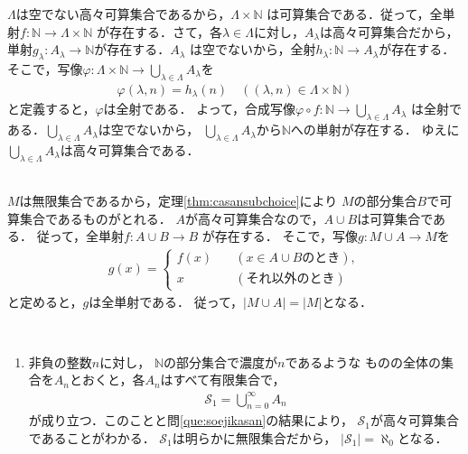 \begin{description}
  $\varLambda$は空でない高々可算集合であるから，$\varLambda \times \mathbb{N}$
  は可算集合である．従って，全単射$f: \mathbb{N} \longrightarrow \varLambda \times \mathbb{N}$
  が存在する．さて，各$\lambda \in \varLambda$に対し，$A_{\lambda}$は高々可算集合だから，
  単射$g_{\lambda} : A_{\lambda} \longrightarrow \mathbb{N}$が存在する．$A_{\lambda}$
  は空でないから，全射$h_{\lambda} : \mathbb{N} \longrightarrow A_{\lambda}$が存在する．
  そこで，写像$\varphi : \varLambda \times \mathbb{N} \longrightarrow 
  \bigcup_{\lambda \in \varLambda } A_{\lambda}$を
  \begin{align*}
    \varphi ( \lambda , n ) = h_{\lambda} (n) \quad
    ( ( \lambda , n) \in \varLambda \times \mathbb{N})
  \end{align*}
  と定義すると，$\varphi$は全射である．
  よって，合成写像$\varphi \circ f: \mathbb{N} \longrightarrow 
  \bigcup_{\lambda \in \varLambda} A_{\lambda}$
  は全射である．$\bigcup_{\lambda \in \varLambda} A_{\lambda}$は空でないから，
  $\bigcup_{\lambda \in \varLambda} A_{\lambda}$から$\mathbb{N}$への単射が存在する．
  ゆえに$\bigcup_{\lambda \in \varLambda} A_{\lambda}$は高々可算集合である．

\item[\refque{que:mugencasan}] \mbox{} \\
  $M$は無限集合であるから，定理\ref{thm:casansubchoice}により
  $M$の部分集合$B$で可算集合であるものがとれる．
  $A$が高々可算集合なので，$A \cup B$は可算集合である．
  従って，全単射$f: A \cup B \longrightarrow B$
  が存在する．
  そこで，写像$g: M \cup A \longrightarrow M$を
  \begin{align*}
    g(x) = \left \{
      \begin{aligned}
        f(x) \quad & ( x \in A \cup B \text{のとき} ) , \\
        x \qquad & ( \text{それ以外のとき} )
      \end{aligned}
      \right.
  \end{align*}
  と定めると，$g$は全単射である．
  従って，$\lvert M \cup A \rvert = \lvert M \rvert$となる．

\item[\refque{que:nyugenkasan}] \mbox{} \\
  \begin{enumerate}
    \item 非負の整数$n$に対し，
      $\mathbb{N}$の部分集合で濃度が$n$であるような
  ものの全体の集合を$A_n$とおくと，各$A_n$はすべて有限集合で，
  \begin{align*}
    \mathscr{S}_1 = \bigcup_{n=0} ^ { \infty} A_n
  \end{align*}
  が成り立つ．このことと問\ref{que:soejikasan}の結果により，
  $\mathscr{S}_1$が高々可算集合であることがわかる．
  $\mathscr{S}_1$は明らかに無限集合だから，
  $\lvert \mathscr{S}_1 \rvert = \aleph _0$となる．



\end{enumerate}
\end{description}
